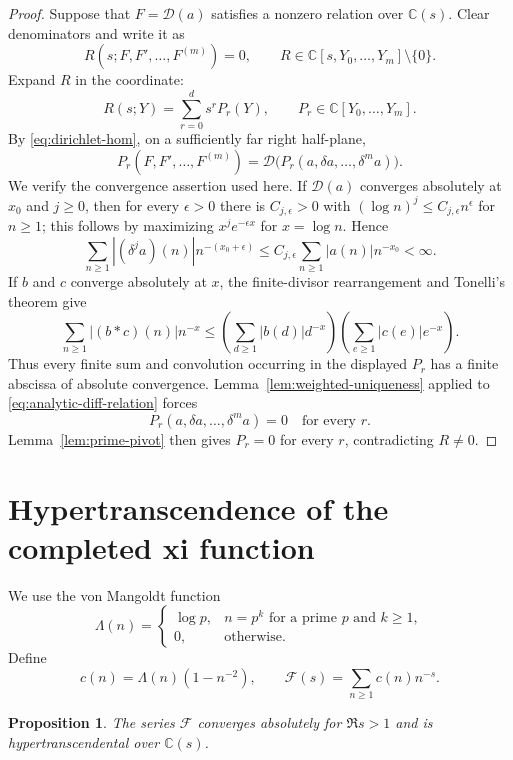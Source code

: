 \documentclass[11pt]{article}
\numberwithin{equation}{section}
\newtheorem{proposition}[theorem]{Proposition}
\theoremstyle{definition}
\theoremstyle{remark}
\newcommand{\C}{\mathbb C}
\newcommand{\D}{\mathcal D}
\begin{document}
\begin{proof}
Suppose that $F=\D(a)$ satisfies a nonzero relation over $\C(s)$.  Clear denominators and write it
as
\begin{equation}
 R(s;F,F',\ldots,F^{(m)})=0,
 \qquad R\in\C[s,Y_0,\ldots,Y_m]\setminus\{0\}.
 \label{eq:analytic-diff-relation}
\end{equation}
Expand $R$ in the coordinate:
\[
 R(s;Y)=\sum_{r=0}^{d}s^rP_r(Y),
 \qquad P_r\in\C[Y_0,\ldots,Y_m].
\]
By \eqref{eq:dirichlet-hom}, on a sufficiently far right half-plane,
\[
 P_r(F,F',\ldots,F^{(m)})
 =\D\bigl(P_r(a,\delta a,\ldots,\delta^m a)\bigr).
\]
We verify the convergence assertion used here.  If $\D(a)$ converges absolutely at $x_0$ and
$j\geq0$, then for every $\epsilon>0$ there is $C_{j,\epsilon}>0$ with
$(\log n)^j\leq C_{j,\epsilon}n^\epsilon$ for $n\geq1$; this follows by maximizing
$x^je^{-\epsilon x}$ for $x=\log n$.  Hence
\[
 \sum_{n\geq1}|(\delta^ja)(n)|n^{-(x_0+\epsilon)}
 \leq C_{j,\epsilon}\sum_{n\geq1}|a(n)|n^{-x_0}<\infty.
\]
If $b$ and $c$ converge absolutely at $x$, the finite-divisor rearrangement and Tonelli's theorem
give
\[
 \sum_{n\geq1}|(b*c)(n)|n^{-x}
 \leq
 \left(\sum_{d\geq1}|b(d)|d^{-x}\right)
 \left(\sum_{e\geq1}|c(e)|e^{-x}\right).
\]
Thus every finite sum and convolution occurring in the displayed $P_r$ has a finite abscissa of
absolute convergence.  Lemma~\ref{lem:weighted-uniqueness} applied to
\eqref{eq:analytic-diff-relation} forces
\[
 P_r(a,\delta a,\ldots,\delta^m a)=0
 \quad\text{for every }r.
\]
Lemma~\ref{lem:prime-pivot} then gives $P_r=0$ for every $r$, contradicting $R\neq0$.
\end{proof}

\section{Hypertranscendence of the completed xi function}
\label{sec:xi}

We use the von Mangoldt function
\[
 \Lambda(n)=
 \begin{cases}
  \log p,&n=p^k\text{ for a prime }p\text{ and }k\geq1,\\
  0,&\text{otherwise}.
 \end{cases}
\]
Define
\begin{equation}
 c(n)=\Lambda(n)(1-n^{-2}),
 \qquad
 \mathcal F(s)=\sum_{n\geq1}c(n)n^{-s}.
 \label{eq:filtered-vm}
\end{equation}

\begin{proposition}
\label{prop:filtered-ht}
The series $\mathcal F$ converges absolutely for $\Re s>1$ and is hypertranscendental over
$\C(s)$.
\end{proposition}
\end{document}
